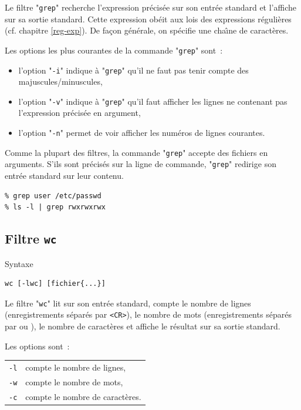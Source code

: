 Le filtre "{\tt grep}" recherche l'expression pr{\'e}cis{\'e}e sur son entr{\'e}e
standard et l'affiche sur sa sortie standard. Cette expression ob{\'e}it aux
lois des expressions r{\'e}guli{\`e}res {\Unix} (cf. chapitre \ref{reg-exp}).
De fa\c{c}on g{\'e}n{\'e}rale, on sp{\'e}cifie une cha{\^\i}ne de caract{\`e}res.

Les options les plus courantes de la commande "{\tt grep}" sont~:
\begin{itemize}
	\item l'option "{\tt -i}" indique {\`a} "{\tt grep}" qu'il ne faut pas
		  tenir compte des majuscules/minuscules,
	\item l'option "{\tt -v}" indique {\`a} "{\tt grep}" qu'il faut afficher
		  les lignes ne contenant pas l'expression pr{\'e}cis{\'e}e en argument,
	\item l'option "{\tt -n}" permet de voir afficher les num{\'e}ros de
		  lignes courantes.
\end{itemize}

Comme la plupart des filtres, la commande "{\tt grep}" accepte des
fichiers en arguments. S'ils sont pr{\'e}cis{\'e}s sur la ligne de commande,
"{\tt grep}" redirige son entr{\'e}e standard sur leur contenu.

\begin{example}
\begin{verbatim}
% grep user /etc/passwd
% ls -l | grep rwxrwxrwx
\end{verbatim}
\end{example}

\subsection{Filtre {\tt wc}}

\begin{definition}{Syntaxe}
\begin{verbatim}
wc [-lwc] [fichier{...}]
\end{verbatim}
\end{definition}

Le filtre "{\tt wc}" lit sur son entr{\'e}e standard,  compte le nombre
de lignes (enregistrements s{\'e}par{\'e}s par \verb=<CR>=), le nombre de mots
(enregistrements s{\'e}par{\'e}s par \spacekey ou \tabkey), le nombre de
caract{\`e}res et affiche le r{\'e}sultat sur sa sortie standard.

Les options sont~:\\
\begin{tabular}{l@{\hspace{0.5cm}}l}
	{\tt -l}	&	compte le nombre de lignes,\\
	{\tt -w}	&	compte le nombre de mots,\\
	{\tt -c}	&	compte le nombre de caract{\`e}res.
\end{tabular}

